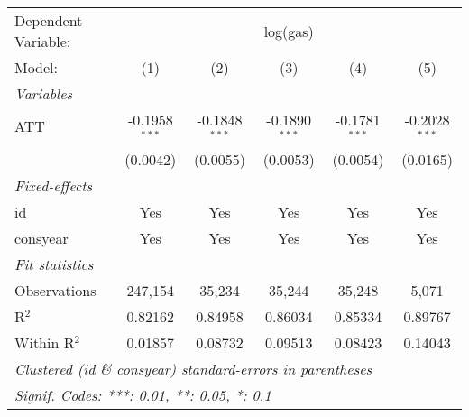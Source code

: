 
\begingroup
\centering
\begin{tabular}{lccccc}
   \tabularnewline \midrule \midrule
   Dependent Variable: & \multicolumn{5}{c}{log(gas)}\\
   Model:       & (1)             & (2)             & (3)             & (4)             & (5)\\  
   \midrule
   \emph{Variables}\\
   ATT          & -0.1958$^{***}$ & -0.1848$^{***}$ & -0.1890$^{***}$ & -0.1781$^{***}$ & -0.2028$^{***}$\\   
                & (0.0042)        & (0.0055)        & (0.0053)        & (0.0054)        & (0.0165)\\   
   \midrule
   \emph{Fixed-effects}\\
   id           & Yes             & Yes             & Yes             & Yes             & Yes\\  
   consyear     & Yes             & Yes             & Yes             & Yes             & Yes\\  
   \midrule
   \emph{Fit statistics}\\
   Observations & 247,154         & 35,234          & 35,244          & 35,248          & 5,071\\  
   R$^2$        & 0.82162         & 0.84958         & 0.86034         & 0.85334         & 0.89767\\  
   Within R$^2$ & 0.01857         & 0.08732         & 0.09513         & 0.08423         & 0.14043\\  
   \midrule \midrule
   \multicolumn{6}{l}{\emph{Clustered (id \& consyear) standard-errors in parentheses}}\\
   \multicolumn{6}{l}{\emph{Signif. Codes: ***: 0.01, **: 0.05, *: 0.1}}\\
\end{tabular}
\par\endgroup


